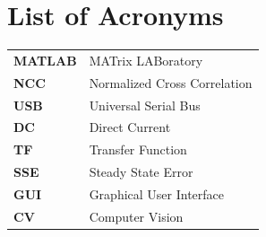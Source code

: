 \providecommand\phantomsection{} \phantomsection
\thispagestyle{plain}
\renewcommand{\baselinestretch}{1}\small\normalsize

\section*{\Huge{List of Acronyms}}
\begin{tabular}{ll}
\textbf{MATLAB} & MATrix LABoratory  \\
\textbf{NCC} & Normalized Cross Correlation \\
\textbf{USB} & Universal Serial Bus \\
\textbf{DC} & Direct Current \\
\textbf{TF} & Transfer Function \\
\textbf{SSE} & Steady State Error \\
\textbf{GUI} & Graphical User Interface \\
\textbf{CV} & Computer Vision \\
\end{tabular}
\justify